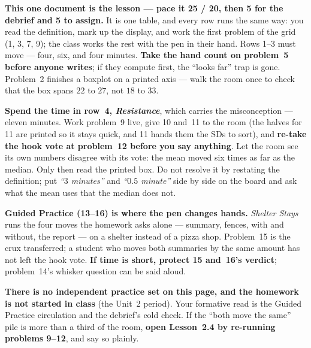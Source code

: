 \documentclass[10pt]{article}
\begin{document}
\begin{teachernote}
\textbf{This one document is the lesson --- pace it 25 / 20, then 5 for the debrief and 5 to
assign.} It is one table, and every row runs the same way: you read the definition, mark up the
display, and work the first problem of the grid (1, 3, 7, 9); the class works the rest with
the pen in their hand. Rows 1--3 must move --- four, six, and four minutes. \textbf{Take the
hand count on problem~5 before anyone writes}; if they compute first, the ``looks far'' trap is
gone. Problem~2 finishes a boxplot on a printed axis --- walk the room once to check that the
box spans $22$ to $27$, not $18$ to $33$.

\textbf{Spend the time in row~4, \emph{Resistance}}, which carries the misconception --- eleven
minutes. Work problem~9 live, give 10 and~11 to the room (the halves for 11 are printed so it
stays quick, and 11 hands them the SDs to sort), and \textbf{re-take the hook vote at
problem~12 before you say anything}. Let the room see its own numbers disagree with its vote: the mean
moved six times as far as the median. Only then read the printed box. Do not resolve it by
restating the definition; put \emph{``$3$ minutes''} and \emph{``$0.5$ minute''} side by side
on the board and ask what the mean uses that the median does not.

\textbf{Guided Practice (13--16) is where the pen changes hands.} \emph{Shelter Stays} runs
the four moves the homework asks alone --- summary, fences, with and without, the report ---
on a shelter instead of a pizza shop. Problem~15 is the crux transferred; a student who moves
both summaries by the same amount has not left the hook vote. \textbf{If time is short,
protect 15 and~16's verdict}; problem~14's whisker question can be said aloud.

\textbf{There is no independent practice set on this page, and the homework is not started in
class} (the Unit~2 period). Your formative read is the Guided Practice circulation and the
debrief's cold check. If the ``both move the same'' pile is more than a third of the room,
\textbf{open Lesson~2.4 by re-running problems 9--12}, and say so plainly.
\end{teachernote}
\end{document}
